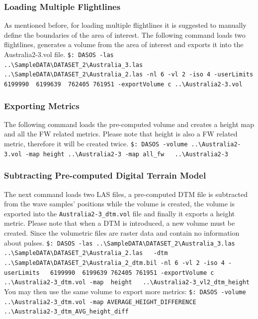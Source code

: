 \documentclass{subfiles}
\begin{document}
		\subsubsection{Loading Multiple Flightlines}
		As mentioned before, for loading multiple flightlines it is suggested to manually define the boundaries of the area of interest. The following command loads two flightlines, generates a volume from the area of interest and exports it into the Australia2-3.vol file.
		\newline\newline
		\verb|$: DASOS -las ..\SampleDATA\DATASET_2\Australia_3.las|\newline \verb|   ..\SampleDATA\DATASET_2\Australia_2.las -nl 6 -vl 2 -iso 4 -userLimits |\newline \verb| 6199990  6199639  762405 761951 -exportVolume c ..\Australia2-3.vol|
		
		\subsubsection{Exporting Metrics}
		The following command loads the pre-computed volume and creates a height map and all the FW related metrics. Please note that height is also a FW related metric, therefore it will be created twice. \newline
		\verb|$: DASOS -volume ..\Australia2-3.vol -map height ..\Australia2-3 -map |\newline \verb|all_fw   ..\Australia2-3|
		
		\subsubsection{Subtracting Pre-computed Digital Terrain Model}
		The next command loads two LAS files, a pre-computed DTM file is subtracted from the wave samples' positions while the volume is created, the volume is exported into the \verb|Australia2-3_dtm.vol| file and finally it exports a height metric.\newline
		Please note that when a DTM is introduced, a new volume must be created. Since the volumetric files are raster data and contain no information about pulses.
		\newline\newline 		
		\verb|$: DASOS -las ..\SampleDATA\DATASET_2\Australia_3.las|\newline \verb|  ..\SampleDATA\DATASET_2\Australia_2.las   -dtm |\newline \verb| ..\SampleDATA\DATASET_2\Australia_2_dtm.bil -nl 6 -vl 2 -iso 4|\newline \verb| -userLimits   6199990  6199639 762405 761951 -exportVolume |\newline \verb|c ..\Australia2-3_dtm.vol -map  height   ..\Australia2-3_vl2_dtm_height|
		\newline\newline
		You may then use the same volume to export more metrics:\newline
		\verb|$: DASOS -volume ..\Australia2-3_dtm.vol -map AVERAGE_HEIGHT_DIFFERENCE |\newline \verb|   ..\Australia2-3_dtm_AVG_height_diff|
		
\end{document}
